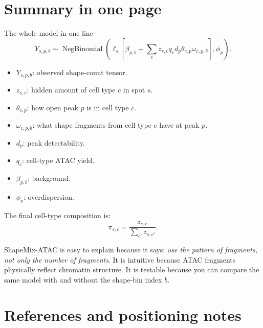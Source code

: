 \documentclass[11pt]{article}
\newcommand{\NB}{\operatorname{NegBinomial}}
\begin{document}
\section{Summary in one page}

\begin{mathbox}{The whole model in one line}
\[
Y_{s,p,b}\sim\NB\left(
\ell_s\left[\beta_{p,b}+\sum_c z_{s,c}q_c d_p\theta_{c,p}\omega_{c,p,b}\right],\phi_p
\right).
\]
\end{mathbox}

\begin{itemize}[leftmargin=2em]
    \item \(Y_{s,p,b}\): observed shape-count tensor.
    \item \(z_{s,c}\): hidden amount of cell type \(c\) in spot \(s\).
    \item \(\theta_{c,p}\): how open peak \(p\) is in cell type \(c\).
    \item \(\omega_{c,p,b}\): what shape fragments from cell type \(c\) have at peak \(p\).
    \item \(d_p\): peak detectability.
    \item \(q_c\): cell-type ATAC yield.
    \item \(\beta_{p,b}\): background.
    \item \(\phi_p\): overdispersion.
\end{itemize}

The final cell-type composition is:
\[
\pi_{s,c}=\frac{z_{s,c}}{\sum_{c'}z_{s,c'}}.
\]

\begin{idea}
ShapeMix-ATAC is easy to explain because it says: \emph{use the pattern of fragments, not only the number of fragments}.  It is intuitive because ATAC fragments physically reflect chromatin structure.  It is testable because you can compare the same model with and without the shape-bin index \(b\).
\end{idea}

\section*{References and positioning notes}
\end{document}
